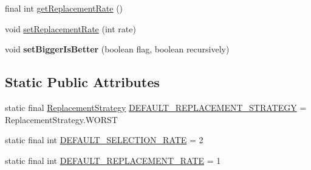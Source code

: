 \begin{CompactItemize}
\item 
final int \hyperlink{classjenes_1_1stage_1_1operator_1_1common_1_1_steady_state_3_01_t_01extends_01_chromosome_01_4_32b13dd16c8bb611085477f02bc23cfc}{getReplacementRate} ()
\item 
void \hyperlink{classjenes_1_1stage_1_1operator_1_1common_1_1_steady_state_3_01_t_01extends_01_chromosome_01_4_8e504ea91d2e2c18fefa54042388e188}{setReplacementRate} (int rate)
\item 
\hypertarget{classjenes_1_1stage_1_1operator_1_1common_1_1_steady_state_3_01_t_01extends_01_chromosome_01_4_4aaac6d7b52c8d107b98ab9170a14715}{
void \textbf{setBiggerIsBetter} (boolean flag, boolean recursively)}
\label{classjenes_1_1stage_1_1operator_1_1common_1_1_steady_state_3_01_t_01extends_01_chromosome_01_4_4aaac6d7b52c8d107b98ab9170a14715}

\end{CompactItemize}
\subsection*{Static Public Attributes}
\begin{CompactItemize}
\item 
static final \hyperlink{classjenes_1_1stage_1_1operator_1_1common_1_1_steady_state_3_01_t_01extends_01_chromosome_01_4_da95b83b7d620e80c70fbed3b8159de1}{ReplacementStrategy} \hyperlink{classjenes_1_1stage_1_1operator_1_1common_1_1_steady_state_3_01_t_01extends_01_chromosome_01_4_4ed786deaaaefebd47fffc18e99b3710}{DEFAULT\_\-REPLACEMENT\_\-STRATEGY} = ReplacementStrategy.WORST
\item 
static final int \hyperlink{classjenes_1_1stage_1_1operator_1_1common_1_1_steady_state_3_01_t_01extends_01_chromosome_01_4_9d6bcfbcf1911ce2936e782e96919ebd}{DEFAULT\_\-SELECTION\_\-RATE} = 2
\item 
static final int \hyperlink{classjenes_1_1stage_1_1operator_1_1common_1_1_steady_state_3_01_t_01extends_01_chromosome_01_4_9700692d577e24267d1105f2a6e3d379}{DEFAULT\_\-REPLACEMENT\_\-RATE} = 1
\end{CompactItemize}
